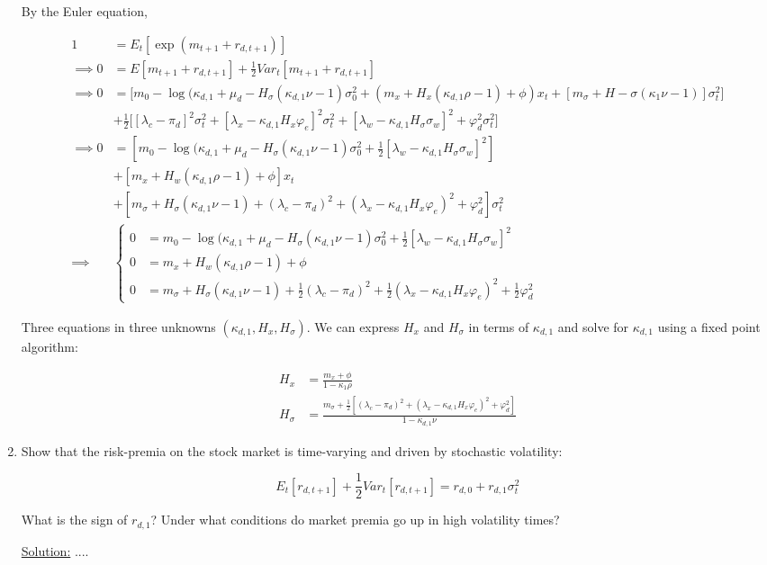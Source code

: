 \documentclass{article}
\begin{document}
\begin{enumerate}
By the Euler equation,

\begin{align*}
1 &= E_t[\exp(m_{t+1} + r_{d,t+1})] \\
\implies 
0 &= E[m_{t+1} + r_{d,t+1}] + \frac{1}{2}Var_t[m_{t+1} + r_{d,t+1}] \\
\implies 
0 &= \Bigg[m_0 - \log(\kappa_{d,1} + \mu_d - H_\sigma(\kappa_{d,1} \nu - 1) \sigma^2_0 + (m_x + H_x (\kappa_{d,1} \rho - 1) + \phi) x_t + [m_\sigma + H-\sigma(\kappa_1 \nu - 1)] \sigma_t^2\Bigg] \\
&+ \frac{1}{2}\Bigg[[\lambda_c - \pi_d]^2 \sigma_t^2 + [\lambda_x - \kappa_{d,1} H_x \varphi_e]^2 \sigma_t^2 + [\lambda_w - \kappa_{d,1} H_\sigma \sigma_w]^2 + \varphi_d^2 \sigma_t^2\Bigg] \\
\implies
0 &= [m_0 - \log(\kappa_{d,1} + \mu_d - H_\sigma(\kappa_{d,1}\nu - 1)\sigma_0^2 + \frac{1}{2}[\lambda_w - \kappa_{d,1} H_\sigma \sigma_w]^2]\\
&+ [m_x + H_w (\kappa_{d,1} \rho - 1) + \phi] x_t \\
&+ [m_\sigma + H_\sigma(\kappa_{d,1} \nu - 1) + (\lambda_c - \pi_d)^2 + (\lambda_x - \kappa_{d,1} H_x \varphi_e)^2 + \varphi_d^2]\sigma_t^2 \\
\implies &
\begin{cases}
0 &= m_0 - \log(\kappa_{d,1} + \mu_d - H_\sigma(\kappa_{d,1}\nu - 1)\sigma_0^2 + \frac{1}{2}[\lambda_w - \kappa_{d,1} H_\sigma \sigma_w]^2 \\
0 &= m_x + H_w (\kappa_{d,1} \rho - 1) + \phi\\
0 &= m_\sigma + H_\sigma(\kappa_{d,1} \nu - 1) + \frac{1}{2}(\lambda_c - \pi_d)^2 + \frac{1}{2}(\lambda_x - \kappa_{d,1} H_x \varphi_e)^2 + \frac{1}{2}\varphi_d^2
\end{cases}
\end{align*}

Three equations in three unknowns $(\kappa_{d,1}, H_x, H_\sigma)$.  We can express $H_x$ and $H_\sigma$ in terms of $\kappa_{d,1}$ and solve for $\kappa_{d,1}$ using a fixed point algorithm:

\begin{align*}
H_x &= \frac{m_x + \phi}{1 - \kappa_1 \rho}\\
H_\sigma &= \frac{m_\sigma + \frac{1}{2}[(\lambda_c - \pi_d)^2 + (\lambda_x - \kappa_{d,1} H_x \varphi_e)^2 + \varphi_d^2]}{1 - \kappa_{d,1}\nu}
\end{align*}

\bigskip

\item Show that the risk-premia on the stock market is time-varying and driven by stochastic volatility:

$$
E_t [r_{d,t+1}] + \frac{1}{2} Var_t [r_{d,t+1}] = r_{d,0} + r_{d,1} \sigma_t^2
$$

What is the sign of $r_{d,1}$? Under what conditions do market premia go up in high volatility times?

\bigskip

\underline{Solution:}  ....

\bigskip

\end{enumerate}
\end{document}

